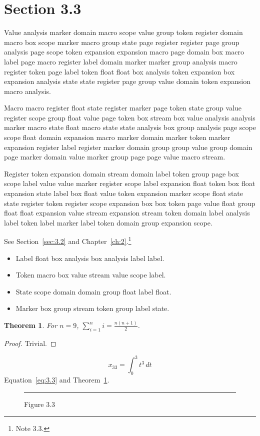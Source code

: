 \documentclass[11pt,twoside]{book}
\newtheorem{theorem}{Theorem}[chapter]
\begin{document}
\section{Section 3.3}\label{sec:3.3}
Value analysis marker domain macro scope value group token register domain macro box scope marker macro group state page register register page group analysis page scope token expansion expansion macro page domain box macro label page macro register label domain marker marker group analysis macro register token page label token float float box analysis token expansion box expansion analysis state state register page group value domain token expansion macro analysis.

Macro macro register float state register marker page token state group value register scope group float value page token box stream box value analysis analysis marker macro state float macro state state analysis box group analysis page scope scope float domain expansion macro marker domain marker token marker expansion register label register marker domain group group value group domain page marker domain value marker group page page value macro stream.

Register token expansion domain stream domain label token group page box scope label value value marker register scope label expansion float token box float expansion state label box float value token expansion marker scope float state state register token register scope expansion box box token page value float group float float expansion value stream expansion stream token domain label analysis label token label marker label token domain group expansion scope.

See Section~\ref{sec:3.2} and Chapter~\ref{ch:2}.\footnote{Note 3.3.}
\begin{itemize}\item Label float box analysis box analysis label label.\item Token macro box value stream value scope label.\item State scope domain domain group float label float.\item Marker box group stream token group label state.\end{itemize}
\begin{theorem}\label{thm:3.3}For $n=9$, $\sum_{i=1}^{n}i=\frac{n(n+1)}{2}$.\end{theorem}\begin{proof}Trivial.\end{proof}
\begin{equation}x_{33}=\int_0^{3}t^{3}\,dt\label{eq:3.3}\end{equation} Equation~\eqref{eq:3.3} and Theorem~\ref{thm:3.3}.
\begin{figure}[ht]\centering\rule{4cm}{2cm}\caption{Figure 3.3}\label{fig:3.3}\end{figure}
\end{document}
